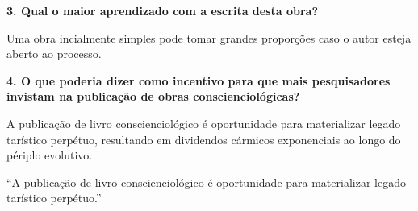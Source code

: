 \documentclass{gescons}
\begin{document}
\begin{multicols}{2}
\textbf{3. Qual o maior aprendizado com a escrita desta obra?}

Uma obra incialmente simples pode tomar grandes proporções caso o autor esteja aberto ao processo. 

\textbf{4. O que poderia dizer como incentivo para que mais pesquisadores invistam na publicação de obras conscienciológicas?}

A publicação de livro conscienciológico é oportunidade para materializar legado tarístico perpétuo, resultando em dividendos cármicos exponenciais ao longo do périplo evolutivo.

\begin{pullquote}
    ``A publicação de livro conscienciológico é oportunidade para materializar legado tarístico perpétuo.''
\end{pullquote}


    
    \end{multicols}
\end{document}
